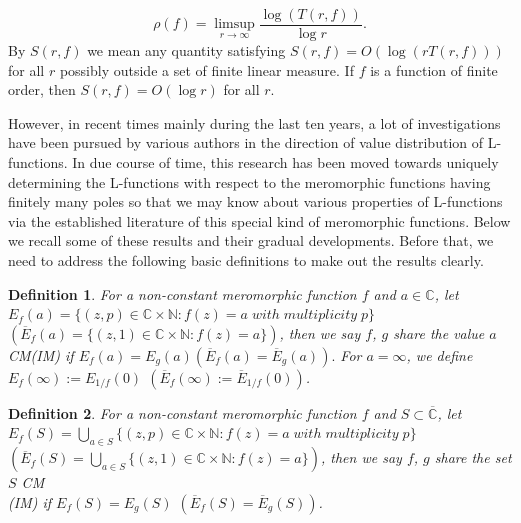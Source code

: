 \documentclass[a4paper,draft]{amsproc}
\theoremstyle{plain}
\newtheorem{defi}{Definition}[section]
\theoremstyle{definition}
\theoremstyle{remark}
\newcommand{\ol}{\overline}
\newcommand{\be}{\begin{equation}}
\newcommand{\ee}{\end{equation}}
\numberwithin{equation}{section}
\begin{document}
	\be\nonumber\rho(f)=\limsup_ {r\rightarrow\infty} \frac{\log(T(r,f))}{\log r}.\ee
	By $S(r, f)$ we mean any quantity satisfying $S(r, f) = O(\log(rT(r, f)))$ for all $r$ possibly outside a set of finite linear measure. If $f$ is a function of finite order, then $S(r, f) = O(\log r)$
	for all $r$. 
	\vspace{0.1in}\par However, in recent times mainly during the last ten years,  a lot of investigations \cite{kac99,li2010,yuan2018,hu2016,selberg1992,steuding2007value}  have been pursued by various authors in the direction of value distribution of L-functions. In due course of time, this research has been moved towards uniquely determining the L-functions with respect to the meromorphic functions having finitely many poles so that we may know about various  properties of L-functions via the established literature of this special kind of meromorphic functions. Below we recall some of these results and their gradual developments. Before that, we need to address the following basic definitions to make out the results clearly. 
	\begin{defi}\cite{3a}
		For a  non-constant meromorphic function $f$ and  $a\in{\mathbb{C}}$, let  $E_{f}(a)=\{(z,p)\in\mathbb{C}\times\mathbb{N}: f(z)=a\; with\; multiplicity\; p\}$ \\$ \left(\ol  E_{f}(a)=\{(z,1)\in\mathbb{C}\times\mathbb{N}: f(z)=a\}\right)$, then we say  $f$, $g$ share the value $a$ CM(IM) if $E_{f}(a)=E_{g}(a)$$\left( \ol E_{f}(a)=\ol E_{g}(a)\right).$ For $a=\infty$, we define $E_f(\infty) := E_{1/f}(0)$ $\left( \ol E_f(\infty) :=\ol  E_{1/f}(0)\right)$.
	\end{defi}
	\begin{defi}\cite{3a}
		For a  non-constant meromorphic function $f$ and  $S\subset\overline{\mathbb{C}}$, let $E_{f}(S)=\bigcup_{a\in S}\{(z,p)\in\mathbb{C}\times\mathbb{N}: f(z)=a\; with\; multiplicity\; p\}$\\ $\left(\ol  E_{f}(S)=\bigcup_{a\in S}\{(z,1)\in\mathbb{C}\times\mathbb{N}: f(z)=a\}\right) $, then we say  $f$, $g$ share the set $S$ CM\\(IM) if $E_{f}(S)=E_{g}(S)$ $\left(\ol  E_{f}(S)=\ol E_{g}(S)\right) $. %
	\end{defi}
\end{document}
